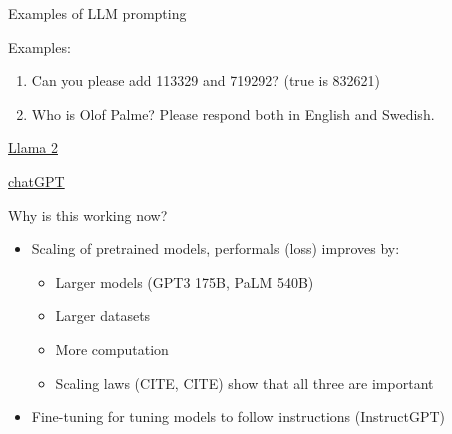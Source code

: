 \documentclass[10pt]{beamer}
\begin{document}
\begin{frame}{Examples of LLM prompting}

Examples:
\begin{enumerate}
\item Can you please add 113329 and 719292? (true is 832621)
\item Who is Olof Palme? Please respond both in English and Swedish.
\end{enumerate}

\centering

\vspace{5mm}

\href{https://www.llama2.ai/}{Llama 2}

\vspace{10mm}

\href{https://chat.openai.com/}{chatGPT}

\end{frame}


\begin{frame}{Why is this working now?}

\begin{itemize}
\item Scaling of pretrained models, performals (loss) improves by:
\begin{itemize}
\item Larger models (GPT3 175B, PaLM 540B)
\item Larger datasets
\item More computation
\item Scaling laws (CITE, CITE) show that all three are important\\
\end{itemize}
\pause
\item Fine-tuning for tuning models to follow instructions (InstructGPT)
\end{itemize}

\end{frame}




\end{document}
